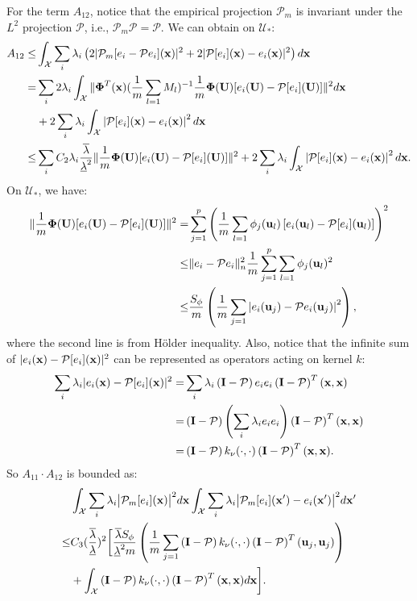 \documentclass[aos,preprint]{imsart}
\theoremstyle{plain}
\newcommand{\CalX}{\mathcal X}
\newcommand{\CalP}{\mathcal P}
\newcommand{\CalU}{\mathcal U}
\newcommand{\Bx}{\bold x}
\newcommand{\BFx}{\bold x}
\newcommand{\BU}{\bold U}
\newcommand{\Bu}{\bold u}
\newcommand{\BPhi}{\boldsymbol{\Phi}}
\theoremstyle{remark}
\begin{document}
\begin{appendix}
For the term $A_{12}$, notice that the empirical projection $\CalP_m$ is invariant under the $L^2$ projection $\CalP$, i.e., $\CalP_m\CalP=\CalP$. We can obtain on $\CalU_*$:
\begin{align*}
   A_{12}\leq &\int_\CalX\sum_{i}\lambda_i\left(2|\CalP_m[e_i-\CalP e_i](\BFx)|^2+2|\CalP[e_i](\BFx)-e_i(\BFx)|^2\right)d\BFx\\
    =&\sum_i2\lambda_i \int_\CalX \|\BPhi^T(\BFx)(\frac{1}{m}\sum_{l=1}M_l)^{-1}\frac{1}{m}\BPhi(\BU)[e_i(\BU)-\CalP[e_i](\BU)]\|^2d\Bx\\
    &+2\sum_i\lambda_i\int_\CalX \left|\CalP[e_i](\BFx)-e_i(\BFx)\right|^2d\BFx\\
    \leq & \sum_iC_2\lambda_i \frac{\overline{\lambda}}{\underline{\lambda}^2}\|\frac{1}{m}\BPhi(\BU)[e_i(\BU)-\CalP[e_i](\BU)]\|^2+2\sum_i\lambda_i\int_\CalX \left|\CalP[e_i](\BFx)-e_i(\BFx)\right|^2d\BFx.
\end{align*}
 On $\CalU_*$, we have:
\begin{align*}
  \|\frac{1}{m}\BPhi(\BU)[e_i(\BU)-\CalP[e_i](\BU)]\|^2= & \sum_{j=1}^p\left(\frac{1}{m}\sum_{l=1}\phi_j(\Bu_l)\left[e_i(\Bu_l)-\CalP[e_i](\Bu_l)\right]\right)^2\\
  \leq & \|e_i-\CalP e_i\|_n^2\frac{1}{m}\sum_{j=1}^p\sum_{l=1}\phi_j(\Bu_l)^2\\
  \leq & \frac{S_\phi}{m}\left(\frac{1}{m}\sum_{j=1}\left|e_i(\Bu_j)-\CalP e_i(\Bu_j)\right|^2\right),
\end{align*}
where the second line is from H\"older inequality. Also, notice that the infinite sum of $|e_i(\BFx)-\CalP[e_i](\BFx)|^2$ can be represented as operators acting on kernel $k$:
\begin{align*}
    \sum_i\lambda_i |e_i(\BFx)-\CalP[e_i](\BFx)|^2=& \sum_i\lambda_i \left(\bold{I}-\CalP\right)e_ie_i\left(\bold{I}-\CalP\right)^T(\BFx,\BFx)\\
    =&\left(\bold{I}-\CalP\right)\left( \sum_i\lambda_i e_ie_i\right)\left(\bold{I}-\CalP\right)^T(\BFx,\BFx)\\
    =&\left(\bold{I}-\CalP\right)k_\nu(\cdot,\cdot)\left(\bold{I}-\CalP\right)^T(\BFx,\BFx).
\end{align*}
So $A_{11}\cdot A_{12}$ is bounded as:
\begin{align*}
    & \int_\CalX\sum_i\lambda_i\big|\CalP_m[e_i](\BFx)\big|^2d\BFx \int_\CalX\sum_i\lambda_i\big|\CalP_m[e_i](\BFx')-e_i(\Bx')\big|^2d\BFx' \\
    \leq&C_3(\frac{\overline{\lambda}}{\underline{\lambda}})^2\bigg[\frac{\overline{\lambda}S_\phi}{\underline{\lambda}^2m}\left(\frac{1}{m}\sum_{j=1}\left(\bold{I}-\CalP\right)k_\nu(\cdot,\cdot)\left(\bold{I}-\CalP\right)^T(\Bu_j,\Bu_j)\right)\\
    &+\int_\CalX\left(\bold{I}-\CalP\right)k_\nu(\cdot,\cdot)\left(\bold{I}-\CalP\right)^T(\BFx,\BFx)d\Bx\bigg].
\end{align*}



\end{appendix}
\end{document}
